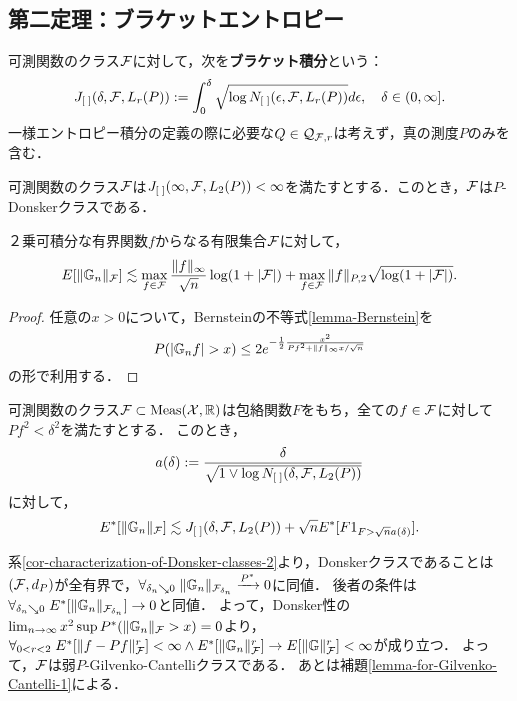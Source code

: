 \documentclass[uplatex,dvipdfmx]{jsreport}
\begin{document}
\subsection{第二定理：ブラケットエントロピー}

\begin{definition}
    可測関数のクラス$\mathcal{F}$に対して，次を\textbf{ブラケット積分}という：
    \[J_{[\;]}(\delta,\mathcal{F},L_r(P)):=\int^\delta_0\sqrt{\log N_{[\;]}(\epsilon,\mathcal{F},L_r(P))}d\epsilon,\quad\delta\in(0,\infty].\]
    一様エントロピー積分の定義の際に必要な$Q\in\mathcal{Q}_{\mathcal{F},r}$は考えず，真の測度$P$のみを含む．
\end{definition}

\begin{theorem}\label{thm-Donsker-2}
    可測関数のクラス$\mathcal{F}$は$J_{[\;]}(\infty,\mathcal{F},L_2(P))<\infty$を満たすとする．このとき，$\mathcal{F}$は$P$-Donskerクラスである．
\end{theorem}

\begin{lemma}
    ２乗可積分な有界関数$f$からなる有限集合$\mathcal{F}$に対して，
    \[E[\|\mathbb{G}_n\|_{\mathcal{F}}]\lesssim\max_{f\in\mathcal{F}}\frac{\|f\|_\infty}{\sqrt{n}}\log(1+\lvert\mathcal{F}\rvert)+\max_{f\in\mathcal{F}}\|f\|_{P,2}\sqrt{\log(1+\lvert\mathcal{F}\rvert)}.\]
\end{lemma}
\begin{proof}
    任意の$x>0$について，Bernsteinの不等式\ref{lemma-Bernstein}を
    \[P(\lvert\mathbb{G}_nf\rvert>x)\le 2e^{-\frac{1}{2}\frac{x^2}{Pf^2+\|f\|_\infty x/\sqrt{n}}}\]
    の形で利用する．
\end{proof}

\begin{lemma}
    可測関数のクラス$\mathcal{F}\subset\mathrm{Meas}(\mathcal{X},\mathbb{R})$は包絡関数$F$をもち，全ての$f\in\mathcal{F}$に対して$Pf^2<\delta^2$を満たすとする．
    このとき，
    \[a(\delta):=\frac{\delta}{\sqrt{1\lor\log N_{[\;]}(\delta,\mathcal{F},L_2(P))}}\]
    に対して，
    \[E^*[\|\mathbb{G}_n\|_{\mathcal{F}}]\lesssim J_{[\;]}(\delta,\mathcal{F},L_2(P))+\sqrt{n}E^*[F1_{F>\sqrt{n}a(\delta)}].\]
\end{lemma}

\begin{remark}
    系\ref{cor-characterization-of-Donsker-classes-2}より，Donskerクラスであることは$(\mathcal{F},d_P)$が全有界で，$\forall_{\delta_n\searrow0}\;\|\mathbb{G}_n\|_{\mathcal{F}_{\delta_n}}\xrightarrow{P^*}0$に同値．
    後者の条件は$\forall_{\delta_n\searrow0}\;E^*[\|\mathbb{G}_n\|_{\mathcal{F}_{\delta_n}}]\to0$と同値．
    よって，Donsker性の$\lim_{n\to\infty}x^2\sup P^*(\|\mathbb{G}_n\|_{\mathcal{F}}>x)=0$より，$\forall_{0<r<2}\;E^*[\|f-Pf\|^r_{\mathcal{F}}]<\infty\land E^*[\|\mathbb{G}_n\|^r_{\mathcal{F}}]\to E[\|\mathbb{G}\|^r_{\mathcal{F}}]<\infty$が成り立つ．
    よって，$\mathcal{F}$は弱$P$-Gilvenko-Cantelliクラスである．
    あとは補題\ref{lemma-for-Gilvenko-Cantelli-1}による．
\end{remark}
\end{document}
